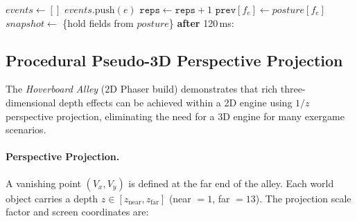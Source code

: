 \documentclass[runningheads]{llncs}
\begin{document}
\begin{algorithm}[htbp]
\caption{Pose-to-Virtual-Input Synthesis}
\label{alg:pose2input}
\begin{algorithmic}[1]
  \State $\mathit{events} \gets []$
   
      \State $\mathit{events}.\text{push}(e)$
      \State {} 
        \State $\texttt{reps} \gets \texttt{reps} + 1$
      \EndIf
    \EndIf
    \State $\texttt{prev}[f_e] \gets \mathit{posture}[f_e]$
  \EndFor
  \State $\mathit{snapshot} \gets$ \{hold fields from $\mathit{posture}$\}
  \State {}
\EndProcedure
\Statex
{}
      \State {}
      \State \textbf{after} 120\,ms: 
    \EndIf
  \EndFor
      \State {}
    \EndIf
  \EndFor
\EndProcedure
\end{algorithmic}
\end{algorithm}

\subsection{Procedural Pseudo-3D Perspective Projection}
\label{sec:pseudo3d}

The \emph{Hoverboard Alley} (2D Phaser build) demonstrates that rich
three-dimensional depth effects can be achieved within a 2D engine using
$1/z$ perspective projection, eliminating the need for a 3D engine for
many exergame scenarios.

\paragraph{Perspective Projection.}
A vanishing point $(V_x, V_y)$ is defined at the far end of the alley.
Each world object carries a depth $z \in [z_{\text{near}}, z_{\text{far}}]$
(near $= 1$, far $= 13$). The projection scale factor and screen
coordinates are:
\end{document}
